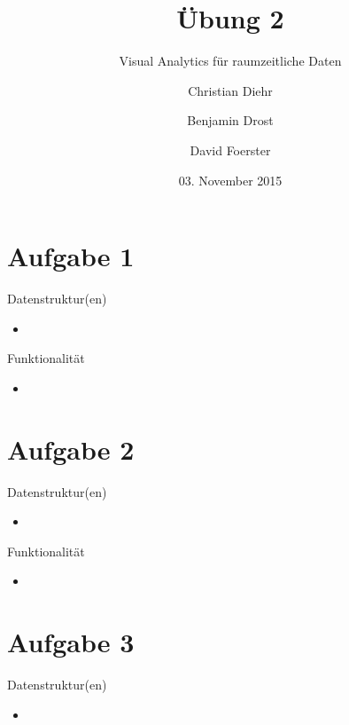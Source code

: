 \documentclass{beamer}
\title{Übung 2}
\subtitle{Visual Analytics für raumzeitliche Daten}
\author{Christian Diehr \and Benjamin Drost \and David Foerster}
\institute{Institut für Informatik\\Humboldt-Universität zu Berlin}
\date{03. November 2015}
\begin{document}
    \begin{frame}
        \titlepage
    \end{frame}
    \logo{} %
    
    \section{Aufgabe 1}
    \begin{frame}{Datenstruktur(en)}
        \begin{itemize}
	        \setlength\itemsep{1em}
        	\item 
        \end{itemize}
    \end{frame}
    
    \begin{frame}{Funktionalität}
    	\begin{itemize}
    		\setlength\itemsep{1em}
    		\item 
    	\end{itemize}
    \end{frame}

    \section{Aufgabe 2}
    \begin{frame}{Datenstruktur(en)}
    	\begin{itemize}
    		\setlength\itemsep{1em}
    		\item 
    	\end{itemize}
    \end{frame}
    
    \begin{frame}{Funktionalität}
    	\begin{itemize}
    		\setlength\itemsep{1em}
    		\item 
    	\end{itemize}
    \end{frame}

    \section{Aufgabe 3}
    \begin{frame}{Datenstruktur(en)}
    	\begin{itemize}
    		\setlength\itemsep{1em}
    		\item 
    	\end{itemize}
    \end{frame}
    
\end{document}
